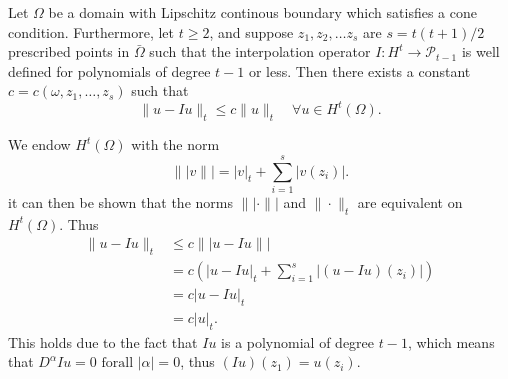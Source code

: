 
\begin{lem}{\quad}
Let $\Omega$ be a domain with Lipschitz continous boundary which satisfies a cone condition. Furthermore, let $t\geq 2$, and suppose $z_1,z_2,\ldots z_s$ are
$s = t(t+1)/2$ prescribed points in $\bar{\Omega}$ such that the interpolation operator $I:H^t \rightarrow \mathcal{P}_{t-1}$ is well defined
for polynomials of degree $t-1$ or less. Then there exists a constant $c=c(\omega,z_1,\ldots,z_s)$ such that
\begin{equation}
    \|u-Iu\|_t\leq c\|u\|_t\quad \forall u\in H^t(\Omega).
    \label{eq:lem_6.2}
\end{equation}
\label{lem:6.2}
\end{lem}

\begin{bev}
    We endow $H^t(\Omega)$ with the norm 
    \begin{equation*}
        \||v\|| = |v|_t + \sum_{i=1}^s |v(z_i)|.
    \end{equation*}
it can then be shown that the norms $\||\cdot\||$ and $\|\cdot\|_t$ are equivalent on $H^t(\Omega)$. Thus
\begin{align*}
    \|u-Iu\|_t&\leq c\||u-Iu\||\\
    &= c(|u-Iu|_t + \sum_{i=1}^s|(u-Iu)(z_i)|)\\
    &= c|u-Iu|_t \\
    &= c|u|_t.
\end{align*}
This holds due to the fact that $Iu$ is a polynomial of degree $t-1$, which means that $D^{\alpha} Iu = 0 \text{ forall } |\alpha|=0$, thus $(Iu)(z_1)=u(z_i)$.


\end{bev}
